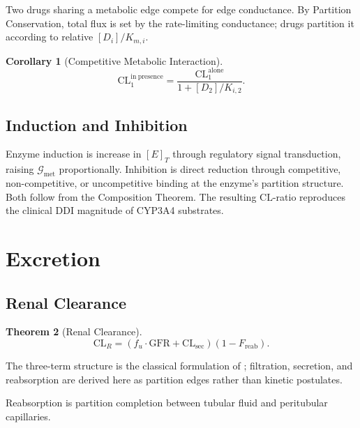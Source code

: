 \documentclass[twocolumn,10pt,a4paper]{article}
\newtheorem{theorem}{Theorem}[section]
\newtheorem{corollary}[theorem]{Corollary}
\theoremstyle{definition}
\theoremstyle{remark}
\newcommand{\Gcond}{\mathcal{G}}
\begin{document}
Two drugs sharing a metabolic edge compete for edge conductance. By Partition Conservation, total flux is set by the rate-limiting conductance; drugs partition it according to relative $[D_i]/K_{m,i}$.

\begin{corollary}[Competitive Metabolic Interaction]
\begin{equation}
    \mathrm{CL}_1^{\mathrm{in\ presence}} = \frac{\mathrm{CL}_1^{\mathrm{alone}}}{1 + [D_2]/K_{i,2}}.
\end{equation}
\end{corollary}

\subsection{Induction and Inhibition}

Enzyme induction is increase in $[E]_T$ through regulatory signal transduction, raising $\Gcond_{\mathrm{met}}$ proportionally. Inhibition is direct reduction through competitive, non-competitive, or uncompetitive binding at the enzyme's partition structure. Both follow from the Composition Theorem. The resulting $\mathrm{CL}$-ratio \citep{rowland_matin_1973,venkatakrishnan_2003} reproduces the clinical DDI magnitude of CYP3A4 substrates.

\section{Excretion}

\subsection{Renal Clearance}

\begin{theorem}[Renal Clearance]
\begin{equation}
    \mathrm{CL}_R = (f_u\cdot\mathrm{GFR} + \mathrm{CL}_{\mathrm{sec}})(1 - F_{\mathrm{reab}}).
\end{equation}
\end{theorem}

The three-term structure is the classical formulation of \citet{smith_1951}; filtration, secretion, and reabsorption are derived here as partition edges rather than kinetic postulates.

Reabsorption is partition completion between tubular fluid and peritubular capillaries.
\end{document}
